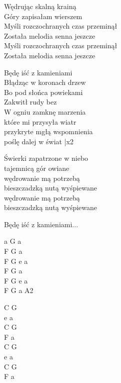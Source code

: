\begin{text}

    Wędrując skalną krainą\\
    Góry zapisałam wierszem\\
    Myśli rozczochranych czas przeminął\\
    Została melodia senna jeszcze\\
    Myśli rozczochranych czas przeminął\\
    Została melodia senna jeszcze	

    \vin Będę iść z kamieniami\\
    \vin Błądząc w koronach drzew\\
    \vin Bo pod słońca powiekami\\
    \vin Zakwitł rudy bez\\
    \vin W ogniu zamknę marzenia\\
    \vin które mi przysyła wiatr\\
    \vin przykryte mgłą wspomnienia\\
    \vin poślę dalej w świat |x2

    Świerki zapatrzone w niebo\\
    tajemnicą gór owiane\\
    wędrowanie mą potrzebą\\
    bieszczadzką nutą wyśpiewane\\
    wędrowanie mą potrzebą\\
    bieszczadzką nutą wyśpiewane

    \vin Będę iść z kamieniami...
  
\end{text}
\begin{chord}

    a G a\\
    F G a\\
    F G e a\\
    F G a\\
    F G e a\\
    F G a A2

    C G\\
    e a\\
    C G\\
    F a\\
    C G\\
    e a\\
    C G\\
    F a
	
\end{chord}